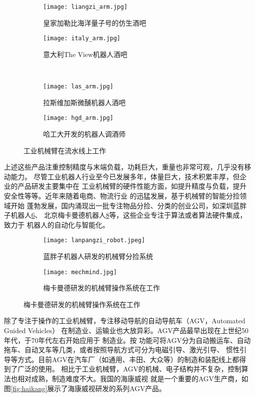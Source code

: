 \begin{figure}
\centering
\begin{subfigure}{.5\textwidth}
  \centering
  \texttt{[image: liangzi\_arm.jpg]}
  \caption{皇家加勒比海洋量子号的仿生酒吧}
  \label{fig:liangzi_arm}
\end{subfigure}%
\begin{subfigure}{.5\textwidth}
  \centering
  \texttt{[image: italy\_arm.jpg]}
  \caption{意大利The View机器人酒吧}
  \label{fig:italy_arm}
\end{subfigure}%
\\
\begin{subfigure}{.5\textwidth}
  \centering
  \texttt{[image: las\_arm.jpg]}
  \caption{拉斯维加斯微醺机器人酒吧}
  \label{fig:las_arm}
\end{subfigure}%
\begin{subfigure}{.5\textwidth}
  \centering
  \texttt{[image: hgd\_arm.jpg]}
  \caption{哈工大开发的机器人调酒师}
  \label{fig:hgd_arm}
\end{subfigure}%
\caption{工业机械臂在流水线上工作}
\end{figure}

上述这些产品注重控制精度与末端负载，功耗巨大，重量也非常可观，几乎没有移动能力。
尽管工业机器人行业至今已发展多年，体量巨大，技术积累丰厚，但企业的产品研发主要集中在
工业机械臂的硬件性能方面，如提升精度与负载，提升安全性等等。近年来随着电商、物流行业
的迅猛发展，基于机械臂的智能分捡领域开始
蓬勃发展，国内涌现出一批专注物品分捡、分类的创业公司，如深圳蓝胖子机器人\ref{fig:lanpangzi}、
北京梅卡曼德机器人\ref{fig:mechmind}等，这些企业专注于算法或者算法硬件集成，致力于
机器人的自动化与智能化。


\begin{figure}
\centering
\begin{subfigure}{.5\textwidth}
  \centering
  \texttt{[image: lanpangzi\_robot.jpeg]}
  \caption{蓝胖子机器人研发的机械臂分捡系统}
  \label{fig:lanpangzi}
\end{subfigure}%
\begin{subfigure}{.5\textwidth}
  \centering
  \texttt{[image: mechmind.jpg]}
  \caption{梅卡曼德研发的机械臂操作系统在工作}
  \label{fig:mechmind}
\end{subfigure}
\end{figure}

除了专注于操作的工业机械臂，专注移动导航的自动导航车（AGV，Automated Guided Vehicles）
在制造业、运输业也大放异彩。AGV产品最早出现在上世纪50年代，于70年代左右开始应用于
制造业\cite{黄志球2010自动导航车}。按
功能可将AGV分为自动搬运车、自动拖车、自动叉车等几类，或者按照导航方式可分为电磁引导、激光引导、
惯性引导等方式。目前AGV在汽车厂（如通用、丰田、大众等）的制造和装配线上都得到了广泛的使用。
相比于工业机械臂，AGV的机械、电子结构并不复杂，控制算法也相对成熟，制造难度不大。我国的海康威视
就是一个重要的AGV生产商，如图\ref{fig:haikang}展示了海康威视研发的系列AGV产品。

